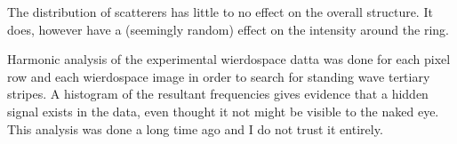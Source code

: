 The distribution of scatterers has little to no effect on the overall
structure.  It does, however have a (seemingly random) effect on the
intensity around the ring.

Harmonic analysis of the experimental wierdospace datta was done for each
pixel row and each wierdospace image in order to search for standing wave
tertiary stripes.  A histogram of the resultant frequencies gives evidence
that a hidden signal exists in the data, even thought it not might be
visible to the naked eye.  This analysis was done a long time ago and I do
not trust it entirely.
